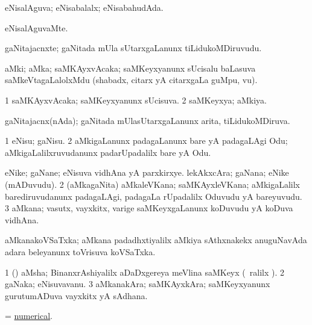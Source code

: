 \bentry
{}
\gl{\gu}
\bmng
eNisalAguva; eNisabalalx; eNisabahudAda. 
\emng
\eentry

\bentry
{}
\gl{\kirxvi}
\bmng
eNisalAguvaMte. 
\emng
\eentry

\bentry
{}
\gl{\nA}
\bmng
gaNitajacnxte; gaNitada mUla sUtarxgaLanunx tiLidukoMDiruvudu. 
\emng
\eentry

\bentry
{}
\gl{\nA}
\bmng
aMki; aMka; saMKAyxvAcaka; saMKeyxyanunx sUcisalu baLasuva saMkeVtagaLalolxMdu (shabadx, citarx yA citarxgaLa guMpu, \mo vu). 
\emng
\eentry

\bentry
{}
\gl{\gu}
\bmng
\bnum
\num{1} saMKAyxvAcaka; saMKeyxyanunx sUcisuva. 
\num{2} saMKeyxya; aMkiya. 
\enum
\emng
\eentry

\bentry
{}
\gl{\gu}
\bmng
gaNitajacnx(nAda); gaNitada mUlasUtarxgaLanunx arita, tiLidukoMDiruva. 
\emng
\eentry

\bentry
{}
\gl{\sakirx}
\bmng
\bnum
\num{1} eNisu; gaNisu. 
\num{2} aMkigaLanunx padagaLanunx bare yA padagaLAgi Odu; aMkigaLalilxruvudanunx padarUpadalilx bare yA Odu. 
\enum
\emng
\eentry

\bentry
{}
\gl{\nA}
\bmng
\bnum
{} 
\banum
{} eNike; gaNane; eNisuva vidhAna yA parxkirxye. 
 lekAkxcAra; gaNana; eNike (mADuvudu). 
\eanum
\numie
\num{2} (aMkagaNita) aMkaleVKana; saMKAyxleVKana; aMkigaLalilx barediruvudanunx padagaLAgi, padagaLa rUpadalilx Oduvudu yA bareyuvudu. 
\num{3} aMkana; vasutx, vayxkitx, \mo varige saMKeyxgaLanunx koDuvudu yA koDuva vidhAna. 
\enum
\emng
\eentry

\bentry
{}
\gl{\nA}
\bmng
aMkanakoVSaTxka; aMkana padadhxtiyalilx aMkiya sAthxnakekx anuguNavAda adara beleyanunx toVrisuva koVSaTxka. 
\emng
\eentry

\bentry
{}
\gl{\nA}
\bmng
\bnum
\num{1} (\ga) aMsha; BinanxrAshiyalilx aDaDxgereya meVlina saMKeyx (\udA\ \eng{$\frac\bg 2\eg\bg 3\eg$}ralilx ). 
\num{2} gaNaka; eNisuvavanu. 
\num{3} aMkanakAra; saMKAyxkAra; saMKeyxyanunx gurutumADuva vayxkitx yA sAdhana. 
\enum
\emng
\eentry

\bentry
{}
\gl{\gu}
\bmng
= \hyperlink{numerical}{numerical}. 
\emng
\eentry

